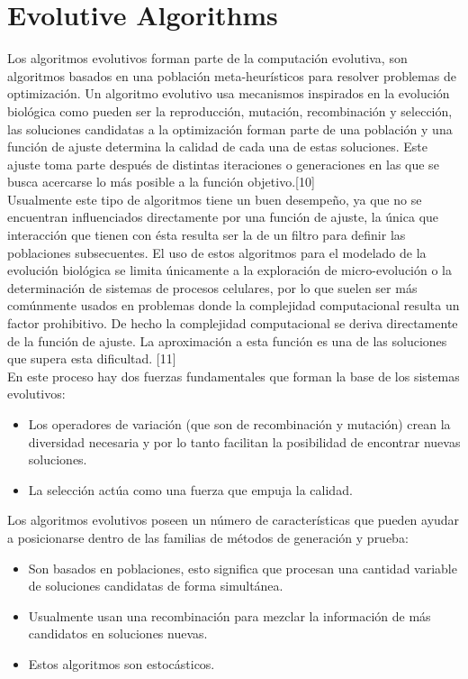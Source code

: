 \section{Evolutive Algorithms}

Los algoritmos evolutivos forman parte de la computación evolutiva, son algoritmos basados en una población meta-heurísticos para resolver problemas de optimización. Un algoritmo evolutivo usa mecanismos inspirados en la evolución biológica como pueden ser la reproducción, mutación, recombinación y selección, las soluciones candidatas a la optimización forman parte de una población y una función de ajuste determina la calidad de cada una de estas soluciones. Este ajuste toma parte después de distintas iteraciones o generaciones en las que se busca acercarse lo más posible a la función objetivo.[10] \\

Usualmente este tipo de algoritmos tiene un buen desempeño, ya que no se encuentran influenciados directamente por una función de ajuste, la única que interacción que tienen con ésta resulta ser la de un filtro para definir las poblaciones subsecuentes. El uso de estos algoritmos para el modelado de la evolución biológica se limita únicamente a la exploración de micro-evolución o la determinación de sistemas de procesos celulares, por lo que suelen ser más comúnmente usados en problemas donde la complejidad computacional resulta un factor prohibitivo. De hecho la complejidad computacional se deriva directamente de la función de ajuste. La aproximación a esta función es una de las soluciones que supera esta dificultad. [11] \\

En este proceso hay dos fuerzas fundamentales que forman la base de los sistemas evolutivos: \\
\begin{itemize}
\item Los operadores de variación (que son de recombinación y mutación) crean la diversidad necesaria y por lo tanto facilitan la posibilidad de encontrar nuevas soluciones.
\item La selección actúa como una fuerza que empuja la calidad.
\end{itemize}

Los algoritmos evolutivos poseen un número de características que pueden ayudar a posicionarse dentro de las familias de métodos de generación y prueba:

\begin{itemize}
\item Son basados en poblaciones, esto significa que procesan una cantidad variable de soluciones candidatas de forma simultánea.
\item Usualmente usan una recombinación para mezclar la información de más candidatos en soluciones nuevas.
\item Estos algoritmos son estocásticos.
\end{itemize}



